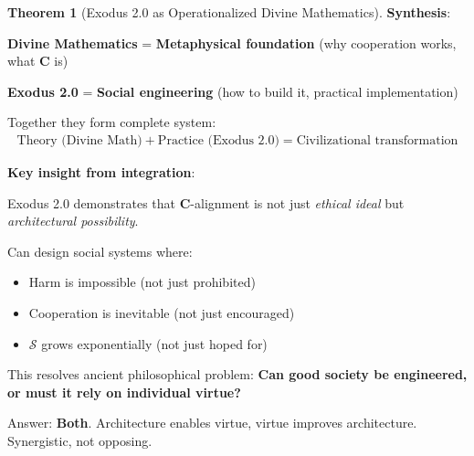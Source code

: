 \documentclass[11pt,a4paper]{article}
\theoremstyle{definition}
\newtheorem{theorem}{Theorem}[section]
\theoremstyle{remark}
\begin{document}
\begin{enumerate}
\begin{theorem}[Exodus 2.0 as Operationalized Divine Mathematics]
\vspace{1em}

\textbf{Synthesis}:

\textbf{Divine Mathematics} = \textbf{Metaphysical foundation} (why cooperation works, what \(\mathbf{C}\) is)

\textbf{Exodus 2.0} = \textbf{Social engineering} (how to build it, practical implementation)

Together they form complete system:
\begin{align}
\text{Theory (Divine Math)} + \text{Practice (Exodus 2.0)} = \text{Civilizational transformation}
\end{align}

\textbf{Key insight from integration}:

Exodus 2.0 demonstrates that \(\mathbf{C}\)-alignment is not just \textit{ethical ideal} but \textit{architectural possibility}.

Can design social systems where:
\begin{itemize}
    \item Harm is impossible (not just prohibited)
    \item Cooperation is inevitable (not just encouraged)
    \item \(\mathcal{S}\) grows exponentially (not just hoped for)
\end{itemize}

This resolves ancient philosophical problem: \textbf{Can good society be engineered, or must it rely on individual virtue?}

Answer: \textbf{Both}. Architecture enables virtue, virtue improves architecture. Synergistic, not opposing.
\end{theorem}

\begin{figure}[H]
\centering
{}
\end{figure}
\end{enumerate}
\end{document}
